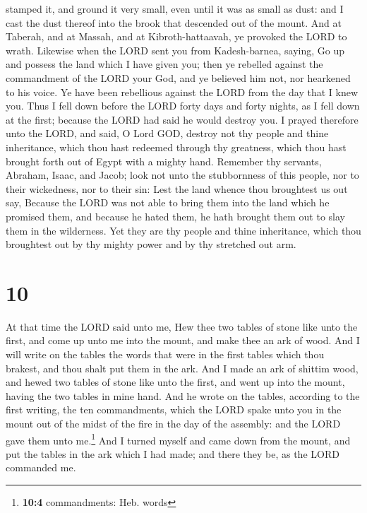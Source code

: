 stamped it, and ground it very small, even until it was as small as
dust: and I cast the dust thereof into the brook that descended out of
the mount.  And at Taberah, and at Massah, and at
Kibroth-hattaavah, ye provoked the LORD to wrath. 
Likewise when the LORD sent you from Kadesh-barnea, saying, Go up and
possess the land which I have given you; then ye rebelled against the
commandment of the LORD your God, and ye believed him not, nor hearkened
to his voice.  Ye have been rebellious against the LORD
from the day that I knew you.  Thus I fell down before
the LORD forty days and forty nights, as I fell down at the first;
because the LORD had said he would destroy you.  I prayed
therefore unto the LORD, and said, O Lord GOD, destroy not thy people
and thine inheritance, which thou hast redeemed through thy greatness,
which thou hast brought forth out of Egypt with a mighty hand.
 Remember thy servants, Abraham, Isaac, and Jacob; look
not unto the stubbornness of this people, nor to their wickedness, nor
to their sin:  Lest the land whence thou broughtest us
out say, Because the LORD was not able to bring them into the land which
he promised them, and because he hated them, he hath brought them out to
slay them in the wilderness.  Yet they are thy people and
thine inheritance, which thou broughtest out by thy mighty power and by
thy stretched out arm.

\hypertarget{section-9}{%
\section{10}\label{section-9}}

 At that time the LORD said unto me, Hew thee two tables
of stone like unto the first, and come up unto me into the mount, and
make thee an ark of wood.  And I will write on the tables
the words that were in the first tables which thou brakest, and thou
shalt put them in the ark.  And I made an ark of shittim
wood, and hewed two tables of stone like unto the first, and went up
into the mount, having the two tables in mine hand.  And
he wrote on the tables, according to the first writing, the ten
commandments, which the LORD spake unto you in the mount out of the
midst of the fire in the day of the assembly: and the LORD gave them
unto me.\footnote{\textbf{10:4} commandments: Heb. words} 
And I turned myself and came down from the mount, and put the tables in
the ark which I had made; and there they be, as the LORD commanded me.


